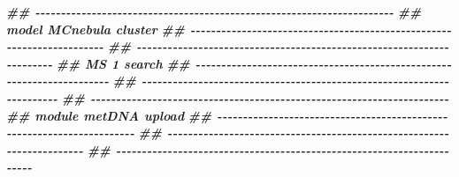 \documentclass[
]{article}
\newenvironment{Shaded}{\begin{snugshade}}{\end{snugshade}}
\newcommand{\DocumentationTok}[1]{\textcolor[rgb]{0.56,0.35,0.01}{\textbf{\textit{#1}}}}
\begin{document}
\begin{Shaded}
\begin{Highlighting}[]
\DocumentationTok{\#\# {-}{-}{-}{-}{-}{-}{-}{-}{-}{-}{-}{-}{-}{-}{-}{-}{-}{-}{-}{-}{-}{-}{-}{-}{-}{-}{-}{-}{-}{-}{-}{-}{-}{-}{-}{-}{-}{-}{-}{-}{-}{-}{-}{-}{-}{-}{-}{-}{-}{-}{-}{-}{-}{-}{-}{-}{-}{-}{-}{-}{-}{-}{-}{-}{-}{-}{-}{-}{-}{-} }
\DocumentationTok{\#\# model MCnebula cluster}
\DocumentationTok{\#\# {-}{-}{-}{-}{-}{-}{-}{-}{-}{-}{-}{-}{-}{-}{-}{-}{-}{-}{-}{-}{-}{-}{-}{-}{-}{-}{-}{-}{-}{-}{-}{-}{-}{-}{-}{-}{-}{-}{-}{-}{-}{-}{-}{-}{-}{-}{-}{-}{-}{-}{-}{-}{-}{-}{-}{-}{-}{-}{-}{-}{-}{-}{-}{-}{-}{-}{-}{-}{-}{-} }
\DocumentationTok{\#\# {-}{-}{-}{-}{-}{-}{-}{-}{-}{-}{-}{-}{-}{-}{-}{-}{-}{-}{-}{-}{-}{-}{-}{-}{-}{-}{-}{-}{-}{-}{-}{-}{-}{-}{-}{-}{-}{-}{-}{-}{-}{-}{-}{-}{-}{-}{-}{-}{-}{-}{-}{-}{-}{-}{-}{-}{-}{-}{-}{-}{-}{-}{-}{-}{-}{-}{-}{-}{-}{-} }
\DocumentationTok{\#\# MS 1 search}
\DocumentationTok{\#\# {-}{-}{-}{-}{-}{-}{-}{-}{-}{-}{-}{-}{-}{-}{-}{-}{-}{-}{-}{-}{-}{-}{-}{-}{-}{-}{-}{-}{-}{-}{-}{-}{-}{-}{-}{-}{-}{-}{-}{-}{-}{-}{-}{-}{-}{-}{-}{-}{-}{-}{-}{-}{-}{-}{-}{-}{-}{-}{-}{-}{-}{-}{-}{-}{-}{-}{-}{-}{-}{-} }
\DocumentationTok{\#\# {-}{-}{-}{-}{-}{-}{-}{-}{-}{-}{-}{-}{-}{-}{-}{-}{-}{-}{-}{-}{-}{-}{-}{-}{-}{-}{-}{-}{-}{-}{-}{-}{-}{-}{-}{-}{-}{-}{-}{-}{-}{-}{-}{-}{-}{-}{-}{-}{-}{-}{-}{-}{-}{-}{-}{-}{-}{-}{-}{-}{-}{-}{-}{-}{-}{-}{-}{-}{-}{-} }
\DocumentationTok{\#\# {-}{-}{-}{-}{-}{-}{-}{-}{-}{-}{-}{-}{-}{-}{-}{-}{-}{-}{-}{-}{-}{-}{-}{-}{-}{-}{-}{-}{-}{-}{-}{-}{-}{-}{-}{-}{-}{-}{-}{-}{-}{-}{-}{-}{-}{-}{-}{-}{-}{-}{-}{-}{-}{-}{-}{-}{-}{-}{-}{-}{-}{-}{-}{-}{-}{-}{-}{-}{-}{-} }
\DocumentationTok{\#\# module metDNA upload}
\DocumentationTok{\#\# {-}{-}{-}{-}{-}{-}{-}{-}{-}{-}{-}{-}{-}{-}{-}{-}{-}{-}{-}{-}{-}{-}{-}{-}{-}{-}{-}{-}{-}{-}{-}{-}{-}{-}{-}{-}{-}{-}{-}{-}{-}{-}{-}{-}{-}{-}{-}{-}{-}{-}{-}{-}{-}{-}{-}{-}{-}{-}{-}{-}{-}{-}{-}{-}{-}{-}{-}{-}{-}{-} }
\DocumentationTok{\#\# {-}{-}{-}{-}{-}{-}{-}{-}{-}{-}{-}{-}{-}{-}{-}{-}{-}{-}{-}{-}{-}{-}{-}{-}{-}{-}{-}{-}{-}{-}{-}{-}{-}{-}{-}{-}{-}{-}{-}{-}{-}{-}{-}{-}{-}{-}{-}{-}{-}{-}{-}{-}{-}{-}{-}{-}{-}{-}{-}{-}{-}{-}{-}{-}{-}{-}{-}{-}{-}{-} }
\DocumentationTok{\#\# {-}{-}{-}{-}{-}{-}{-}{-}{-}{-}{-}{-}{-}{-}{-}{-}{-}{-}{-}{-}{-}{-}{-}{-}{-}{-}{-}{-}{-}{-}{-}{-}{-}{-}{-}{-}{-}{-}{-}{-}{-}{-}{-}{-}{-}{-}{-}{-}{-}{-}{-}{-}{-}{-}{-}{-}{-}{-}{-}{-}{-}{-}{-}{-}{-}{-}{-}{-}{-}{-} }
\end{Highlighting}
\end{Shaded}
\end{document}
